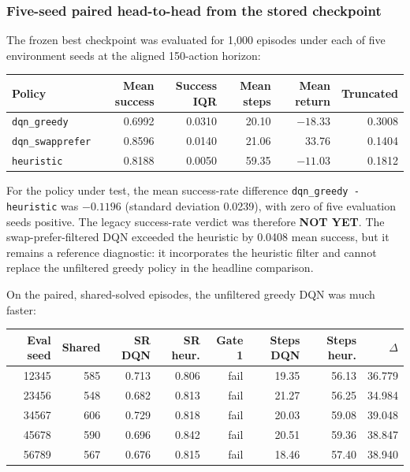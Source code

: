\documentclass[11pt]{article}
\newcommand{\code}[1]{\texttt{#1}}
\begin{document}
\subsubsection*{Five-seed paired head-to-head from the stored checkpoint}

The frozen best checkpoint was evaluated for 1{,}000 episodes under each of five
environment seeds at the aligned 150-action horizon:

\begin{center}
\small
\begin{tabular}{lrrrrr}
\toprule
Policy & Mean success & Success IQR & Mean steps & Mean return & Truncated \\
\midrule
\code{dqn\_greedy}     & 0.6992 & 0.0310 & 20.10 & $-18.33$ & 0.3008 \\
\code{dqn\_swapprefer} & 0.8596 & 0.0140 & 21.06 &  33.76   & 0.1404 \\
\code{heuristic}       & 0.8188 & 0.0050 & 59.35 & $-11.03$ & 0.1812 \\
\bottomrule
\end{tabular}
\end{center}

For the policy under test, the mean success-rate difference
\code{dqn\_greedy - heuristic} was $-0.1196$ (standard deviation 0.0239), with
zero of five evaluation seeds positive. The legacy success-rate verdict was
therefore \textbf{NOT YET}. The swap-prefer-filtered DQN exceeded the heuristic
by 0.0408 mean success, but it remains a reference diagnostic: it incorporates
the heuristic filter and cannot replace the unfiltered greedy policy in the
headline comparison.

On the paired, shared-solved episodes, the unfiltered greedy DQN was much faster:

\begin{center}
\small
\begin{tabular}{rrrrrrrr}
\toprule
Eval seed & Shared & SR DQN & SR heur. & Gate 1 & Steps DQN & Steps heur. & $\Delta$ \\
\midrule
12345 & 585 & 0.713 & 0.806 & fail & 19.35 & 56.13 & 36.779 \\
23456 & 548 & 0.682 & 0.813 & fail & 21.27 & 56.25 & 34.984 \\
34567 & 606 & 0.729 & 0.818 & fail & 20.03 & 59.08 & 39.048 \\
45678 & 590 & 0.696 & 0.842 & fail & 20.51 & 59.36 & 38.847 \\
56789 & 567 & 0.676 & 0.815 & fail & 18.46 & 57.40 & 38.940 \\
\bottomrule
\end{tabular}
\end{center}
\end{document}
